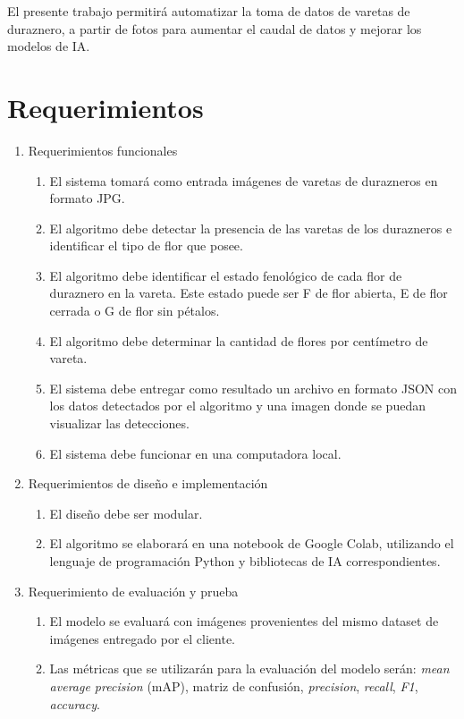 El presente trabajo permitirá automatizar la toma de datos de varetas de duraznero, a partir de fotos para aumentar el caudal de datos y mejorar los modelos de IA.

\section{Requerimientos}

\begin{enumerate}
	\item Requerimientos funcionales
		\begin{enumerate}
			\item El sistema tomará como entrada imágenes de varetas de durazneros en formato JPG.			
			\item El algoritmo debe detectar la presencia de las varetas de los durazneros e identificar el tipo de flor que posee.			        
			\item El algoritmo debe identificar el estado fenológico de cada flor de duraznero en la vareta. Este estado puede ser F de flor abierta, E de flor cerrada o G de flor sin pétalos. 
			\item El algoritmo debe determinar la cantidad de flores por centímetro de vareta.
			\item El sistema debe entregar como resultado un archivo en formato JSON con los datos detectados por el algoritmo y una imagen donde se puedan visualizar las detecciones.
			\item El sistema debe funcionar en una computadora local.
		\end{enumerate}
	\item Requerimientos de diseño e implementación
		\begin{enumerate}
			\item El diseño debe ser modular.
			\item El algoritmo se elaborará en una notebook de Google Colab, utilizando el lenguaje de  programación Python y bibliotecas de IA correspondientes. 
		\end{enumerate}
	\item Requerimiento de evaluación y prueba
	\begin{enumerate}
			\item El modelo se evaluará con imágenes provenientes del mismo dataset de imágenes entregado por el cliente.
			 \item Las métricas que se utilizarán para la evaluación del modelo serán: \textit{mean average precision} (mAP), matriz de confusión, \textit{precision}, \textit{recall}, \textit{F1}, \textit{accuracy}.

\end{enumerate}
\end{enumerate}
